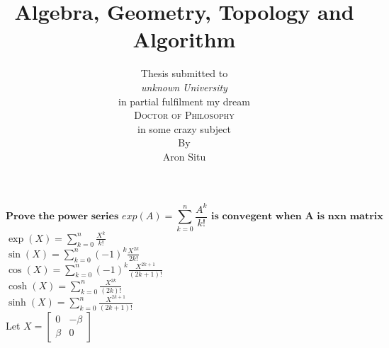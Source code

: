 \documentclass{book}
\begin{document}
\title{\bfseries {\sc\textcolor{title}{Algebra, Geometry, Topology and Algorithm}}}
\author{\textcolor{other}{Thesis  submitted to} \\[5pt]
\emph{\textcolor{other}{unknown University}}\\[2cm]
 \textcolor{other}{in partial fulfilment my dream} \\[2cm]
\textsc{\Large{\textcolor{phd}{Doctor of Philosophy}}} \\[5pt]
  \textcolor{other}{in some crazy subject} \vspace{0.4cm} \\[1in]
  \textcolor{other}{By}\\[5pt] {\Large \sc \textcolor{name}{Aron Situ}}
   \vspace{2cm}
}
\date{}
\maketitle
\[ \textbf{Prove the power series } exp(A) = \sum_{k=0}^{n} \frac{A^{k}}{k!} \textbf{ is convegent when A is nxn matrix} \]
$\exp(X) = \sum_{k=0}^{n} \frac{X^{k}}{k!}$\\
$\sin(X) = \sum_{k=0}^{n} (-1)^{k}\frac{X^{2k}}{2k!}$\\
$\cos(X) = \sum_{k=0}^{n} (-1)^{k}\frac{X^{2k+1}}{(2k+1)!}$\\
$\cosh(X) = \sum_{k=0}^{n} \frac{X^{2k}}{(2k)!}$\\
$\sinh(X) = \sum_{k=0}^{n} \frac{X^{2k+1}}{(2k+1)!}$\\

Let $ X = 
    \begin{bmatrix}
    0 & -\beta \\
    \beta & 0 
    \end{bmatrix}
$\\
\end{document}
